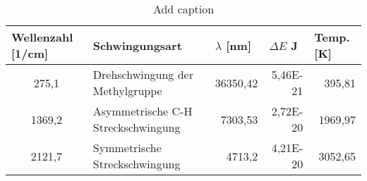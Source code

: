 \begin{table}[H]
  \centering
  \caption{Add caption}
    \begin{tabular}{clrrr}
    \toprule
    \multicolumn{1}{l}{\textbf{Wellenzahl [1/cm]}} & \textbf{Schwingungsart} & \multicolumn{1}{l}{\boldmath{}\textbf{$\lambda$ [nm]}\unboldmath{}} & \multicolumn{1}{l}{\boldmath{}\textbf{$\Delta E$ J}\unboldmath{}} & \multicolumn{1}{l}{\textbf{Temp. [K]}} \\
    \midrule
    275,1 & Drehschwingung der Methylgruppe & 36350,42 & 5,46E-21 & 395,81 \\
    1369,2 & Asymmetrische C-H Streckschwingung & 7303,53 & 2,72E-20 & 1969,97 \\
    2121,7 & Symmetrische Streckschwingung & 4713,2 & 4,21E-20 & 3052,65 \\
    \bottomrule
    \end{tabular}%
  \label{tab:addlabel}%
\end{table}%
